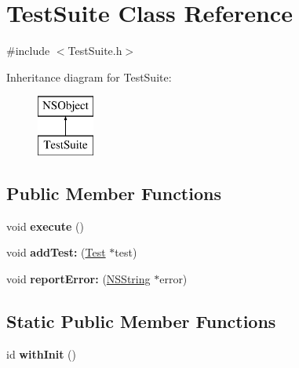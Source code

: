 \hypertarget{interface_test_suite}{
\section{\-Test\-Suite \-Class \-Reference}
\label{interface_test_suite}
}


{\ttfamily \#include $<$\-Test\-Suite.\-h$>$}

\-Inheritance diagram for \-Test\-Suite\-:\begin{figure}[H]
\begin{center}
\leavevmode
\includegraphics[height=2.000000cm]{interface_test_suite}
\end{center}
\end{figure}
\subsection*{\-Public \-Member \-Functions}
\begin{DoxyCompactItemize}
\item 
\hypertarget{interface_test_suite_a826277e2dc89602f2acc43009e640e27}{
void {\bfseries execute} ()}
\label{interface_test_suite_a826277e2dc89602f2acc43009e640e27}

\item 
\hypertarget{interface_test_suite_ae626f4e348b00bf67315bdb3cb8b2eb8}{
void {\bfseries add\-Test\-:} (\hyperlink{interface_test}{\-Test} $\ast$test)}
\label{interface_test_suite_ae626f4e348b00bf67315bdb3cb8b2eb8}

\item 
\hypertarget{interface_test_suite_a91c84e1bd7702a974f5c582263632ece}{
void {\bfseries report\-Error\-:} (\hyperlink{class_n_s_string}{\-N\-S\-String} $\ast$error)}
\label{interface_test_suite_a91c84e1bd7702a974f5c582263632ece}

\end{DoxyCompactItemize}
\subsection*{\-Static \-Public \-Member \-Functions}
\begin{DoxyCompactItemize}
\item 
\hypertarget{interface_test_suite_afd8da29d355156b4b6cc8ccf8fc96d20}{
id {\bfseries with\-Init} ()}
\label{interface_test_suite_afd8da29d355156b4b6cc8ccf8fc96d20}

\end{DoxyCompactItemize}
